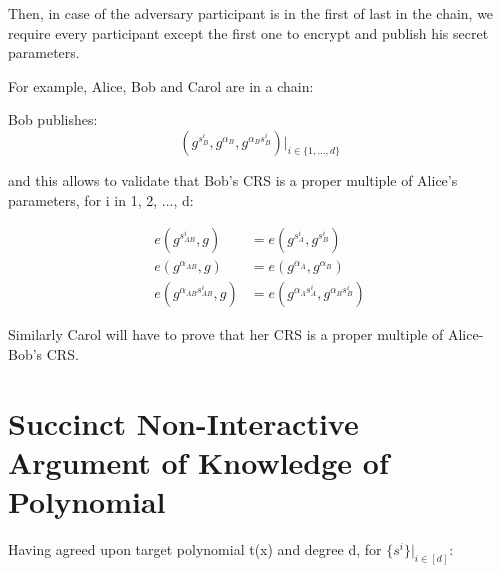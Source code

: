 \documentclass[a4paper,11pt]{article}
\begin{document}
Then, in case of the adversary participant is in the first of last in the chain, we require every participant except the first one to encrypt and publish his	 secret parameters.  

For  example, Alice, Bob and Carol are in a chain:

Bob publishes: 
\begin{displaymath}
(g^{s_B^i}, g^{\alpha_B}, g^{\alpha_B{s_B^i}}) |_{i \in \{1, ... , d\}}
\end{displaymath}

and this allows to validate that Bob's CRS is a proper multiple of Alice's parameters, for i in 1, 2, ..., d:

\begin{displaymath}
\begin{split}
e(g^{s_{AB}^i}, g)  &= e(g^{s_A^i},g^{s_B^i} ) \\
e(g^{{\alpha}_{AB}}, g) &= e(g^{\alpha_A}, g^{\alpha_B}) \\
e(g^{{\alpha}_{AB}{s_{AB}^i}}, g) &= e(g^{\alpha_A s_A^i}, g^{\alpha_B s_B^i}) 
\end{split}
\end{displaymath}

Similarly Carol will have to prove that her CRS is a proper multiple of Alice-Bob’s CRS.

\section{Succinct Non-Interactive Argument of Knowledge of Polynomial}

Having agreed upon target polynomial t(x) and degree d,  for $\{s^i\}|_{i \in [d]}$: 
\end{document}
